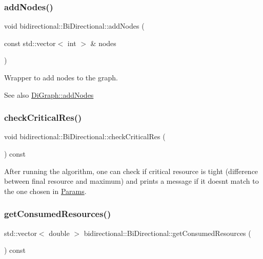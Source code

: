 \subsubsection{\texorpdfstring{add\+Nodes()}{addNodes()}}
{\footnotesize\ttfamily void bidirectional\+::\+Bi\+Directional\+::add\+Nodes (\begin{DoxyParamCaption}\item[{const std\+::vector$<$ int $>$ \&}]{nodes }\end{DoxyParamCaption})\hspace{0.3cm}{\ttfamily [inline]}}



Wrapper to add nodes to the graph. 

\begin{DoxySeeAlso}{See also}
\hyperlink{classbidirectional_1_1DiGraph_a483c50e9b5b483472ae7ee2910f3bcda}{Di\+Graph\+::add\+Nodes} 
\end{DoxySeeAlso}
\mbox{\label{classbidirectional_1_1BiDirectional_ad57667c8edeafda55eba523d02ff33e6}} 
\subsubsection{\texorpdfstring{check\+Critical\+Res()}{checkCriticalRes()}}
{\footnotesize\ttfamily void bidirectional\+::\+Bi\+Directional\+::check\+Critical\+Res (\begin{DoxyParamCaption}{ }\end{DoxyParamCaption}) const}

After running the algorithm, one can check if critical resource is tight (difference between final resource and maximum) and prints a message if it doesn\textquotesingle{}t match to the one chosen in \hyperlink{classbidirectional_1_1Params}{Params}. \mbox{\label{classbidirectional_1_1BiDirectional_a426412403ca7693f52b12a198d3f57c5}} 
\subsubsection{\texorpdfstring{get\+Consumed\+Resources()}{getConsumedResources()}}
{\footnotesize\ttfamily std\+::vector$<$ double $>$ bidirectional\+::\+Bi\+Directional\+::get\+Consumed\+Resources (\begin{DoxyParamCaption}{ }\end{DoxyParamCaption}) const}



